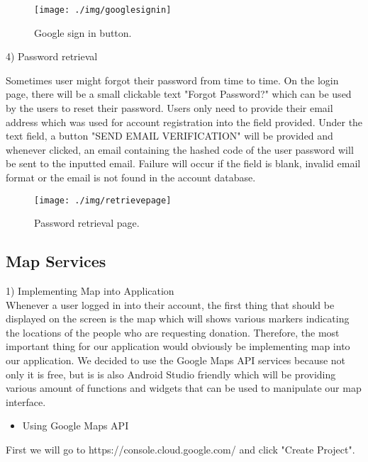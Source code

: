 \documentclass[conference]{IEEEtran}
\begin{document}
\begin{figure}[h!]
\texttt{[image: ./img/googlesignin]}
\centering
\caption{Google sign in button.}
\end{figure}



4) Password retrieval\\
\par Sometimes user might forgot their password from time to time. On the login page, there will be a small clickable text "Forgot Password?" which can be used by the users to reset their password. Users only need to provide their email address which was used for account registration into the field provided. Under the text field, a button "SEND EMAIL VERIFICATION" will be provided and whenever clicked, an email containing the hashed code of the user password will be sent to the inputted email. Failure will occur if the field is blank, invalid email format or the email is not found in the account database.

\begin{figure}[h!]
\texttt{[image: ./img/retrievepage]}
\centering
\caption{Password retrieval page.}
\end{figure}

\subsection{Map Services}

1) Implementing Map into Application\\

Whenever a user logged in into their account, the first thing that should be displayed on the screen is the map which will shows various markers indicating the locations of the people who are requesting donation. Therefore, the most important thing for our application would obviously be implementing map into our application. We decided to use the Google Maps API services because not only it is free, but is is also Android Studio friendly which will be providing various amount of functions and widgets that can be used to manipulate our map interface.\\

\begin{itemize}
\item Using Google Maps API
\end{itemize}
First we will go to https://console.cloud.google.com/ and click "Create Project".
\end{document}
